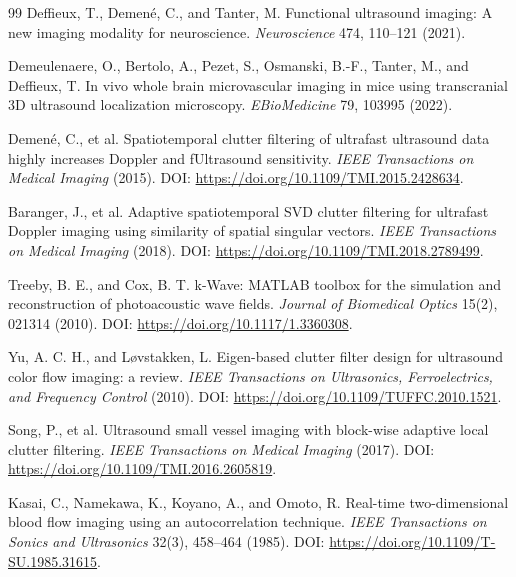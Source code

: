 \documentclass[11pt]{article}
\begin{document}
\begin{thebibliography}{99}
Deffieux, T., Demen{\'e}, C., and Tanter, M.
\newblock Functional ultrasound imaging: A new imaging modality for neuroscience.
\newblock \emph{Neuroscience} 474, 110--121 (2021).

Demeulenaere, O., Bertolo, A., Pezet, S., Osmanski, B.-F., Tanter, M., and Deffieux, T.
\newblock In vivo whole brain microvascular imaging in mice using transcranial 3D ultrasound localization microscopy.
\newblock \emph{EBioMedicine} 79, 103995 (2022).

Demen{\'e}, C., et al.
\newblock Spatiotemporal clutter filtering of ultrafast ultrasound data highly increases Doppler and fUltrasound sensitivity.
\newblock \emph{IEEE Transactions on Medical Imaging} (2015).
\newblock DOI: \url{https://doi.org/10.1109/TMI.2015.2428634}.

Baranger, J., et al.
\newblock Adaptive spatiotemporal SVD clutter filtering for ultrafast Doppler imaging using similarity of spatial singular vectors.
\newblock \emph{IEEE Transactions on Medical Imaging} (2018).
\newblock DOI: \url{https://doi.org/10.1109/TMI.2018.2789499}.

Treeby, B. E., and Cox, B. T.
\newblock k-Wave: MATLAB toolbox for the simulation and reconstruction of photoacoustic wave fields.
\newblock \emph{Journal of Biomedical Optics} 15(2), 021314 (2010).
\newblock DOI: \url{https://doi.org/10.1117/1.3360308}.

Yu, A. C. H., and L{\o}vstakken, L.
\newblock Eigen-based clutter filter design for ultrasound color flow imaging: a review.
\newblock \emph{IEEE Transactions on Ultrasonics, Ferroelectrics, and Frequency Control} (2010).
\newblock DOI: \url{https://doi.org/10.1109/TUFFC.2010.1521}.

Song, P., et al.
\newblock Ultrasound small vessel imaging with block-wise adaptive local clutter filtering.
\newblock \emph{IEEE Transactions on Medical Imaging} (2017).
\newblock DOI: \url{https://doi.org/10.1109/TMI.2016.2605819}.

Kasai, C., Namekawa, K., Koyano, A., and Omoto, R.
\newblock Real-time two-dimensional blood flow imaging using an autocorrelation technique.
\newblock \emph{IEEE Transactions on Sonics and Ultrasonics} 32(3), 458--464 (1985).
\newblock DOI: \url{https://doi.org/10.1109/T-SU.1985.31615}.


\end{thebibliography}
\end{document}
